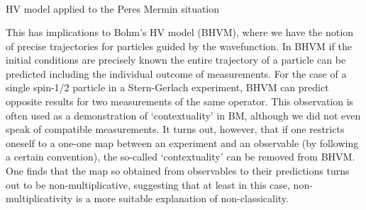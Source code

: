 \documentclass[british,aps,prl,superscriptaddress,nofootinbib,times,reprint]{revtex4-1}
\theoremstyle{plain}
\theoremstyle{plain}
\theoremstyle{definition}
\theoremstyle{remark}
\theoremstyle{remark}
\theoremstyle{remark}
\theoremstyle{plain}
\theoremstyle{plain}
\theoremstyle{plain}
\theoremstyle{definition}
\theoremstyle{definition}
\begin{document}
\begin{table}
\begin{equation*}
\begin{array}{ccc}

\label{eq:toyModel}
\end{array}
\end{equation*}
\caption{HV model applied to the Peres Mermin situation}
\label{tbl:HVmodel}
\end{table}
This has implications to Bohm's HV model (BHVM),
where we have the notion of precise trajectories
for particles guided by the wavefunction.  In BHVM
if the initial conditions are precisely known the
entire trajectory of a particle can be predicted
including the individual outcome of measurements.
For the case of a single spin-1/2 particle in a
Stern-Gerlach experiment, BHVM can predict
opposite results for two measurements of the
same operator.  This observation is often used as
a demonstration of `contextuality' in BM, although
we did not even speak of compatible
measurements\cite{??}.  It turns out, however,
that if one restricts oneself to a one-one map
between an experiment and an observable (by
following a certain convention), the so-called
`contextuality' can be removed from BHVM.  One
finds that the map so obtained from observables to
their predictions turns out to be
non-multiplicative, suggesting that at least in
this case, non-multiplicativity is a more suitable
explanation of non-classicality.
\end{document}
